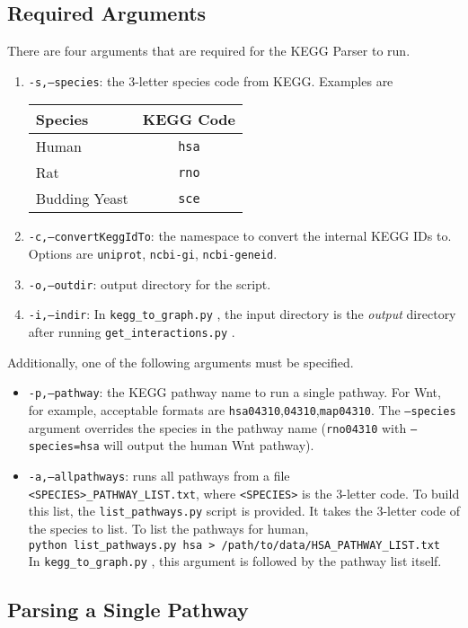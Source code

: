 \documentclass[10pt]{article}
\newcommand{\getinteractions}{\texttt{get\_interactions.py} }
\newcommand{\keggtograph}{\texttt{kegg\_to\_graph.py} }
\newcommand{\listpathways}{\texttt{list\_pathways.py} }
\begin{document}
\subsection{Required Arguments}
There are four arguments that are required for the KEGG Parser to run.
\begin{enumerate}
\item \texttt{-s,--species}: the 3-letter species code from KEGG.  Examples are
\begin{center}
\begin{tabular}{l|c}
\textbf{Species} & \textbf{KEGG Code} \\ \hline
Human & \texttt{hsa} \\
Rat & \texttt{rno} \\
Budding Yeast & \texttt{sce}
\end{tabular}
\end{center}
\item \texttt{-c,--convertKeggIdTo}: the namespace to convert the internal KEGG IDs to.  Options are \texttt{uniprot}, \texttt{ncbi-gi}, \texttt{ncbi-geneid}.
\item \texttt{-o,--outdir}: output directory for the script.
\item \texttt{-i,--indir}: In \keggtograph, the input directory is the \emph{output} directory after running \getinteractions.
\end{enumerate}
\noindent Additionally, one of the following arguments must be specified.
\begin{itemize}
\item \texttt{-p,--pathway}: the KEGG pathway name to run a single pathway. For Wnt, for example, acceptable formats are \texttt{hsa04310},\texttt{04310},\texttt{map04310}.  The \texttt{--species} argument overrides the species in the pathway name (\texttt{rno04310} with \texttt{--species=hsa} will output the human Wnt pathway).
\item \texttt{-a,--allpathways}: runs all pathways from a file \texttt{<SPECIES>\_PATHWAY\_LIST.txt}, where \texttt{<SPECIES>} is the 3-letter code.   To build this list, the \listpathways script is provided. It takes the 3-letter code of the species to list. To list the pathways for human,\\
\texttt{python list\_pathways.py hsa > /path/to/data/HSA\_PATHWAY\_LIST.txt}\\
\noindent In \keggtograph, this argument is followed by the pathway list itself.
\end{itemize}
\subsection{Parsing a Single Pathway}
\end{document}
